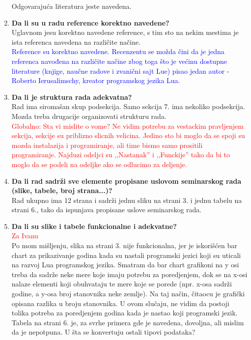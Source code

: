 \documentclass[a4paper]{report}
\newcommand{\odgovorAutora}[1]{\textcolor{blue}{#1}}
\newcommand{\note}[1]{\textcolor{red}{#1}}
\begin{document}
\begin{enumerate}
  Odgovaraju\' ca literatura jeste navedena.
\item \textbf {Da li su u radu reference korektno navedene?}\\
  Uglavnom jesu korektno navedene reference, s tim sto na nekim mestima je ista referenca navedena na razli\v cite na\v cine. \\
\odgovorAutora{Reference su korektno navedene. Recenzentu se možda čini da je jedna referenca navođena na različite načine zbog toga što je većinu dostupne literature (knjige, naučne radove i zvanični sajt Lue) pisao jedan autor - Roberto Ierusalimschy, kreator programskog jezika Lua.}
\item \textbf {Da li je struktura rada adekvatna?}\\
  Rad ima siroma\v san skup podsekcija. Samo sekcija 7. ima nekoliko podsekcija. Mozda treba drugacije organizovati strukturu rada. \\
\note{Globalno: Sta vi mislite o vome? Ne vidim potrebu za vestackim pravljenjem sekcija, sekcije su priblizno slicnih velicina. Jedino sto bi moglo da se spoji su mozda instalazija i programiranje, ali time bismo samo prositili programiranje. Najduzi odeljci su ,,Nastanak'' i ,,Funckije'' tako da bi to moglo da se podeli na odeljke ako se odlucimo za deljenje.}
\item \textbf {Da li rad sadrži sve elemente propisane uslovom seminarskog rada (slike, tabele, broj strana...)?}\\
  Rad ukupno ima 12 strana i sadr\v zi jednu sliku na strani 3. i jednu tabelu na strani 6., tako da ispunjava propisane uslove seminarskog rada.
\item \textbf {Da li su slike i tabele funkcionalne i adekvatne?}\\ \note{Za Ivanu} \\
  Po mom mi\v sljenju, slika na strani 3. nije funkcionalna, jer je iskori\v s\' cen bar chart za prikazivanje godina kada su nastali programski jezici koji su uticali na razvoj Lua programskog jezika. Smatram da bar chart grafikoni na y osi treba da sadr\v ze neke mere koje imaju potrebu za poredjenjem, dok se na x-osi nalaze elementi koji obuhvataju te mere koje se porede (npr. x-osa sadr\v zi godine, a y-osa broj stanovnika neke zemlje). Na taj na\v cin, \v citaocu je grafi\v cki opisana razlika u
    broju stanovnika. U ovom slu\v caju, ne vidim da postoji tolika potreba za poredjenjem godina kada je nastao koji programski jezik.\\
  Tabela na strani 6. je, za svrhe primera gde je navedena, dovoljna, ali mislim da je nepotpuna. U \v sta se konvertuju ostali tipovi podataka?
\end{enumerate}
\end{document}

